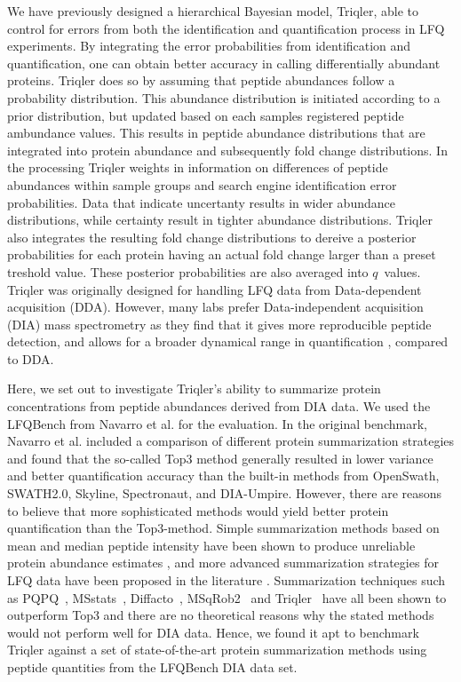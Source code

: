 \documentclass[10pt,letterpaper]{article}
\begin{document}
We have previously designed a hierarchical Bayesian model, Triqler, able to control for errors from both the identification and quantification process in LFQ experiments\cite{the2019integrated}. By integrating the error probabilities from identification and quantification, one can obtain better accuracy in calling differentially abundant proteins. Triqler does so by assuming that peptide abundances follow a probability distribution. This abundance distribution is initiated according to a prior distribution, but updated based on each samples registered peptide ambundance values. This results in peptide abundance distributions that are integrated into protein abundance and subsequently fold change distributions. In the processing Triqler weights in information on differences of peptide abundances within sample groups and search engine identification error probabilities. Data that indicate uncertanty results in wider abundance distributions, while certainty result in tighter abundance distributions. Triqler also integrates the resulting fold change distributions to dereive a posterior probabilities for each protein having an actual fold change larger than a preset treshold value. These posterior probabilities are also averaged into $q$~values. Triqler was originally designed for handling LFQ data from Data-dependent acquisition (DDA). However, many labs prefer Data-independent acquisition (DIA) mass spectrometry \cite{venable2004automated} as they find that it gives more reproducible peptide detection, and allows for a broader dynamical range in quantification \cite{bern2010deconvolution,zhang2020DIA}, compared to DDA. 

Here, we set out to investigate Triqler's ability to summarize protein concentrations from peptide abundances derived from DIA data. We used the LFQBench from Navarro et al. \cite{navarro2016multicenter} for the evaluation. In the original benchmark, Navarro et al. included a comparison of different protein summarization strategies and found that the so-called Top3 method generally resulted in lower variance and better quantification accuracy than the built-in methods from OpenSwath, SWATH2.0, Skyline, Spectronaut, and DIA-Umpire\cite{navarro2016multicenter}. However, there are reasons to believe that more sophisticated methods would yield better protein quantification than the Top3-method. Simple summarization methods based on mean and median peptide intensity have been shown to produce unreliable protein abundance estimates \cite{goeminne2015summarization}, and more advanced summarization strategies for LFQ data have been proposed in the literature \cite{silva2006absolute,cox2014accurate}. Summarization techniques such as PQPQ~\cite{forshed2011enhanced}, MSstats~\cite{choi2014msstats}, Diffacto~\cite{zhang2017covariation}, MSqRob2~\cite{sticker2020robust} and Triqler~\cite{the2019integrated} have all been shown to outperform Top3 and there are no theoretical reasons why the stated methods would not perform well for DIA data. Hence, we found it apt to benchmark Triqler against a set of state-of-the-art protein summarization methods using peptide quantities from the LFQBench DIA data set.
 
\end{document}
